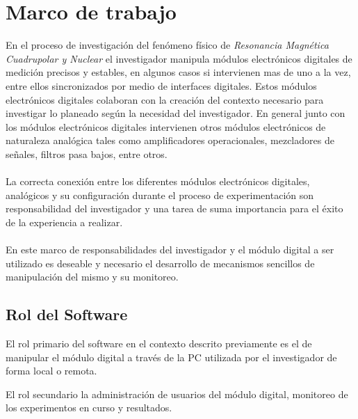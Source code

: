 \section{Marco de trabajo}

En el proceso de investigaci\'on del fen\'omeno f\'isico de \textit{Resonancia Magn\'etica Cuadrupolar y Nuclear} 
el investigador manipula m\'odulos electr\'onicos digitales de medici\'on precisos 
y estables, en algunos casos si intervienen mas de uno a la vez, entre ellos sincronizados 
por medio de interfaces digitales. 
Estos m\'odulos electr\'onicos digitales colaboran con la creaci\'on del contexto necesario 
para investigar lo planeado seg\'un la necesidad del investigador.
En general junto con los m\'odulos electr\'onicos digitales intervienen otros m\'odulos electr\'onicos de 
naturaleza anal\'ogica tales como amplificadores operacionales, mezcladores de señales, 
filtros pasa bajos, entre otros.
\\\\
La correcta conexi\'on entre los diferentes m\'odulos electr\'onicos digitales, 
anal\'ogicos y su configuraci\'on durante el proceso de experimentaci\'on son 
responsabilidad del investigador y una tarea de suma importancia para el \'exito de la experiencia a realizar.
\\\\
En este marco de responsabilidades del investigador y el m\'odulo digital a ser utilizado es deseable 
y necesario el desarrollo de mecanismos sencillos de manipulaci\'on del mismo y su monitoreo.

\subsection{Rol del Software}

El rol primario del software en el contexto descrito previamente es el de manipular 
el m\'odulo digital a trav\'es de la PC utilizada por el investigador de forma local o remota.

El rol secundario la administraci\'on de usuarios del m\'odulo digital, monitoreo de los experimentos en curso y resultados.

\newpage

